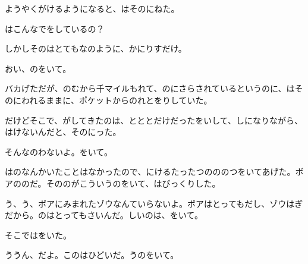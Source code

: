 ようやくがけるようになると、はそのにねた。

はこんなでをしているの？

しかしそのはとてもなのように、かにりすだけ。

おい、のをいて。

バカげただが、のむから千マイルもれて、のにさらされているというのに、はそのにわれるままに、ポケットからのれとをりしていた。

だけどそこで、がしてきたのは、とととだけだったをいして、しになりながら、はけないんだと、そのにった。

そんなのわないよ。をいて。

はのなんかいたことはなかったので、にけるたったつのののつをいてあげた。ボアののだ。そののがこういうのをいて、はびっくりした。

う、う、ボアにみまれたゾウなんていらないよ。ボアはとってもだし、ゾウはぎだから。のはとってもさいんだ。しいのは、をいて。

そこではをいた。

ううん、だよ。このはひどいだ。うのをいて。

